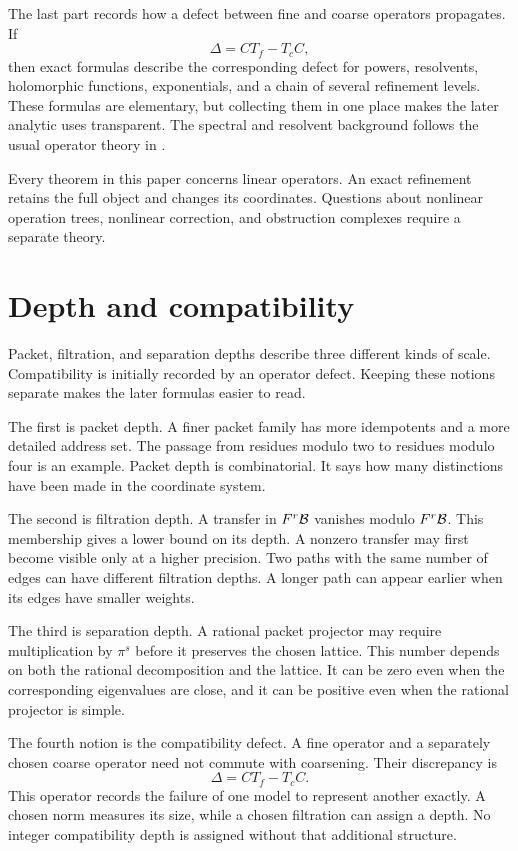 The last part records how a defect between fine and coarse operators propagates.  If
\[
\Delta=CT_f-T_cC,
\]
then exact formulas describe the corresponding defect for powers, resolvents, holomorphic functions, exponentials, and a chain of several refinement levels.  These formulas are elementary, but collecting them in one place makes the later analytic uses transparent.  The spectral and resolvent background follows the usual operator theory in \cite{Kato1995}.

Every theorem in this paper concerns linear operators. An exact refinement retains the full object and changes its coordinates. Questions about nonlinear operation trees, nonlinear correction, and obstruction complexes require a separate theory.

\section{Depth and compatibility}\label{sec:four_depths}

Packet, filtration, and separation depths describe three different kinds of scale. Compatibility is initially recorded by an operator defect. Keeping these notions separate makes the later formulas easier to read.

The first is packet depth.  A finer packet family has more idempotents and a more detailed address set.  The passage from residues modulo two to residues modulo four is an example.  Packet depth is combinatorial.  It says how many distinctions have been made in the coordinate system.

The second is filtration depth. A transfer in $F^r\mathcal B$ vanishes modulo $F^r\mathcal B$. This membership gives a lower bound on its depth. A nonzero transfer may first become visible only at a higher precision. Two paths with the same number of edges can have different filtration depths. A longer path can appear earlier when its edges have smaller weights.

The third is separation depth.  A rational packet projector may require multiplication by $\pi^s$ before it preserves the chosen lattice.  This number depends on both the rational decomposition and the lattice.  It can be zero even when the corresponding eigenvalues are close, and it can be positive even when the rational projector is simple.

The fourth notion is the compatibility defect. A fine operator and a separately chosen coarse operator need not commute with coarsening. Their discrepancy is
\[
\Delta=CT_f-T_cC.
\]
This operator records the failure of one model to represent another exactly. A chosen norm measures its size, while a chosen filtration can assign a depth. No integer compatibility depth is assigned without that additional structure.


